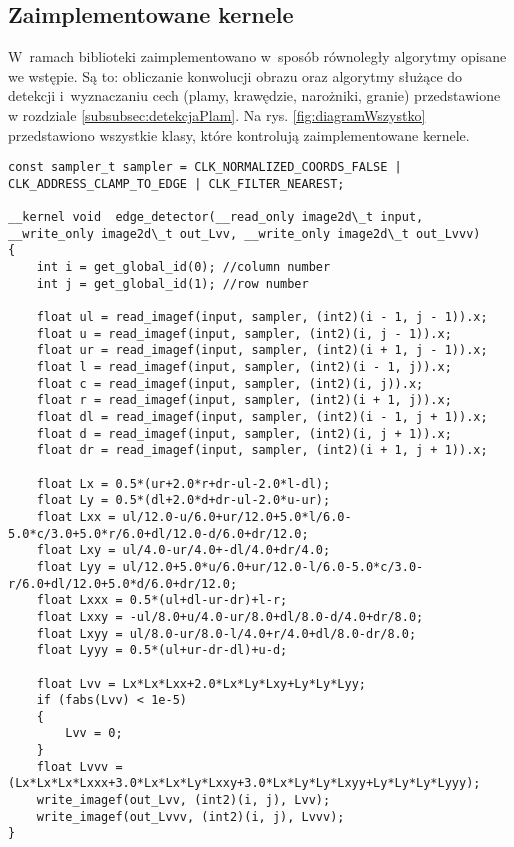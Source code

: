 \subsection{Zaimplementowane kernele}
\label{subsec:kernele}

W~ramach biblioteki zaimplementowano w~sposób równoległy algorytmy opisane we wstępie. Są to: obliczanie konwolucji obrazu oraz algorytmy służące do detekcji i~wyznaczaniu cech (plamy, krawędzie, narożniki, granie) przedstawione w rozdziale \ref{subsubsec:detekcjaPlam}. Na rys. \ref{fig:diagramWszystko} przedstawiono wszystkie klasy, które kontrolują zaimplementowane kernele.


\begin{lstlisting}[float]
const sampler_t sampler = CLK_NORMALIZED_COORDS_FALSE | CLK_ADDRESS_CLAMP_TO_EDGE | CLK_FILTER_NEAREST;

__kernel void  edge_detector(__read_only image2d\_t input, __write_only image2d\_t out_Lvv, __write_only image2d\_t out_Lvvv)
{
	int i = get_global_id(0); //column number
	int j = get_global_id(1); //row number

	float ul = read_imagef(input, sampler, (int2)(i - 1, j - 1)).x;
	float u = read_imagef(input, sampler, (int2)(i, j - 1)).x;
	float ur = read_imagef(input, sampler, (int2)(i + 1, j - 1)).x;
	float l = read_imagef(input, sampler, (int2)(i - 1, j)).x;
	float c = read_imagef(input, sampler, (int2)(i, j)).x;
	float r = read_imagef(input, sampler, (int2)(i + 1, j)).x;
	float dl = read_imagef(input, sampler, (int2)(i - 1, j + 1)).x;
	float d = read_imagef(input, sampler, (int2)(i, j + 1)).x;
	float dr = read_imagef(input, sampler, (int2)(i + 1, j + 1)).x;

	float Lx = 0.5*(ur+2.0*r+dr-ul-2.0*l-dl);
	float Ly = 0.5*(dl+2.0*d+dr-ul-2.0*u-ur);
	float Lxx = ul/12.0-u/6.0+ur/12.0+5.0*l/6.0-5.0*c/3.0+5.0*r/6.0+dl/12.0-d/6.0+dr/12.0;
	float Lxy = ul/4.0-ur/4.0+-dl/4.0+dr/4.0;
	float Lyy = ul/12.0+5.0*u/6.0+ur/12.0-l/6.0-5.0*c/3.0-r/6.0+dl/12.0+5.0*d/6.0+dr/12.0;
	float Lxxx = 0.5*(ul+dl-ur-dr)+l-r;
	float Lxxy = -ul/8.0+u/4.0-ur/8.0+dl/8.0-d/4.0+dr/8.0;
	float Lxyy = ul/8.0-ur/8.0-l/4.0+r/4.0+dl/8.0-dr/8.0;
	float Lyyy = 0.5*(ul+ur-dr-dl)+u-d;
	
	float Lvv = Lx*Lx*Lxx+2.0*Lx*Ly*Lxy+Ly*Ly*Lyy;
	if (fabs(Lvv) < 1e-5)
	{
		Lvv = 0;
	}
	float Lvvv = (Lx*Lx*Lx*Lxxx+3.0*Lx*Lx*Ly*Lxxy+3.0*Lx*Ly*Ly*Lxyy+Ly*Ly*Ly*Lyyy);
	write_imagef(out_Lvv, (int2)(i, j), Lvv);
	write_imagef(out_Lvvv, (int2)(i, j), Lvvv);
}
\end{lstlisting}

